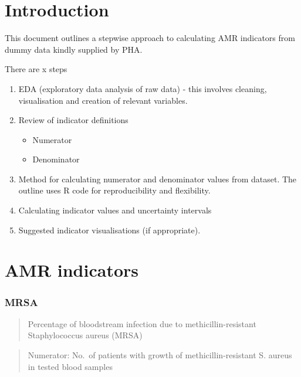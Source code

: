\documentclass[
  letterpaper,
  DIV=11,
  numbers=noendperiod]{scrreprt}
\begin{document}

\chapter{Introduction}\label{introduction-1}

This document outlines a stepwise approach to calculating AMR indicators
from dummy data kindly supplied by PHA.

There are x steps

\begin{enumerate}
\def\labelenumi{\arabic{enumi}.}
\item
  EDA (exploratory data analysis of raw data) - this involves cleaning,
  visualisation and creation of relevant variables.
\item
  Review of indicator definitions

  \begin{itemize}
  \item
    Numerator
  \item
    Denominator
  \end{itemize}
\item
  Method for calculating numerator and denominator values from dataset.
  The outline uses R code for reproducibility and flexibility.
\item
  Calculating indicator values and uncertainty intervals
\item
  Suggested indicator visualisations (if appropriate).
\end{enumerate}


\chapter{AMR indicators}\label{amr-indicators}

\subsection{MRSA}\label{mrsa}

\begin{quote}
Percentage of bloodstream infection due to methicillin-resistant
Staphylococcus aureus (MRSA)
\end{quote}

\begin{quote}
Numerator: No.~of patients with growth of methicillin-resistant S.
aureus in tested blood samples
\end{quote}
\end{document}
